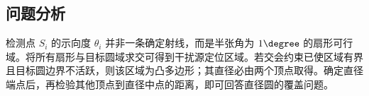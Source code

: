 \subsection{问题分析}

检测点 \(S_i\) 的示向度 \(\theta_i\) 并非一条确定射线，而是半张角为 \(1\degree\) 的扇形可行域。将所有扇形与目标圆域求交可得到干扰源定位区域。若交会约束已使区域有界且目标圆边界不活跃，则该区域为凸多边形；其直径必由两个顶点取得。确定直径端点后，再检验其他顶点到直径中点的距离，即可回答直径圆的覆盖问题。
